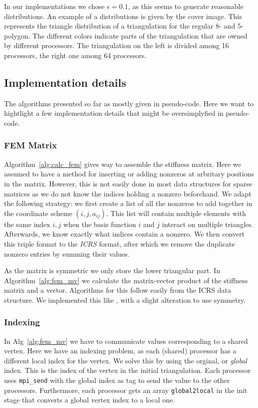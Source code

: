 \documentclass[11pt]{amsart}
\theoremstyle{definition}
\begin{document}
In our implementations we chose $\epsilon = 0.1$, as this seems to generate reasonable distributions. An example of a distributions is given by the cover image. This represents the triangle distribution of a triangulation for the  regular 8- and 5-polygon. The different colors indicate parts of the triangulation that are owned by different processors. The triangulation on the left is divided among 16 processors, the right one among 64 processors. 
\subsection{Implementation details}
The algorithms presented so far as mostly given in pseudo-code. Here we want to hightlight a few implementation details that might be oversimplyfied in pseudo-code.
\subsubsection*{FEM Matrix}
Algorithm~\ref{alg:calc_fem} gives way to assemble the stiffness matrix. Here
we assumed to have a method for inserting or adding nonzeros at arbritary positions in the matrix. However,
this is not easily done in most data structures for sparse matrices as we do not know the
indices holding a nonzero beforehand. We adapt the following strategy: we first create a list
of all the nonzeros to add together in the coordinate scheme $(i,j,a_{ij})$.
This list will contain multiple elements with the same index $i,j$ when
the basis function $i$ and $j$ interact on multiple triangles. Afterwards, we know
exactly what indices contain a nonzero. We then convert this triple format to the \emph{ICRS}
\cite[p.~171]{biss04} format, after which we remove the duplicate nonzero entries by summing their values.

As the matrix is symmetric we only store the lower triangular part. In Algorithm~\ref{alg:fem_mv}
we calculate the matrix-vector product of the stiffness matrix and a vector. Algorithms for this
follow easily from the ICRS data structure. We implemented this like \cite[Alg.~4.4]{biss04}, with
a slight alteration to use symmetry.

\subsubsection*{Indexing}
In Alg~\ref{alg:fem_mv} we have to communicate values corresponding to a shared vertex. Here we have an indexing problem, as each (shared) processor has a different local index for the vertex. We solve this by using the orginal, or \emph{global} index. This is the index of the vertex in the initial triangulation. Each processor uses \verb=mpi_send= with the global index as tag to send the value to the other processors. Furthermore, each processor gets an array \verb=global2local= in the init stage that converts a global vertex index to a local one.
\end{document}
